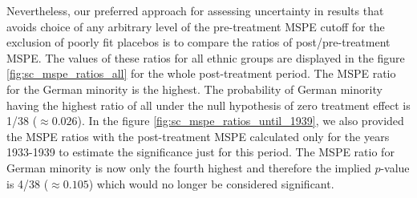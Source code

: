 Nevertheless, our preferred approach for assessing uncertainty in results that avoids  choice of any arbitrary level of the pre-treatment MSPE cutoff for the exclusion of poorly fit  placebos
is to compare the ratios of  post/pre-treatment MSPE. 
The values of these ratios for all ethnic groups are displayed in the figure \ref{fig:sc_mspe_ratios_all} for the whole post-treatment period. The MSPE ratio for the German minority is  the highest. The probability of German minority having the highest ratio of all under the null hypothesis of zero treatment effect is 1/38 ($\approx 0.026$). 
In the figure \ref{fig:sc_mspe_ratios_until_1939}, we also provided the MSPE ratios  with the post-treatment MSPE calculated only for the years 
1933-1939  to estimate the significance just for this period.
The MSPE ratio for German minority is now only the fourth highest and therefore the implied $p$-value  is  4/38 ($\approx 0.105$) which would no longer be considered significant.  


